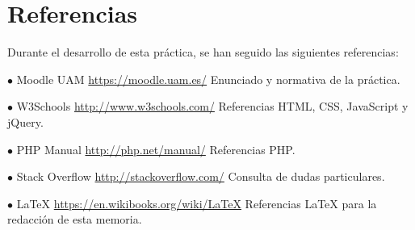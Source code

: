 \documentclass{article}
\begin{document}
\section{Referencias}
Durante el desarrollo de esta práctica, se han seguido las siguientes referencias:
\begin{ldescription}
    \item[$\bullet$ Moodle UAM \url{https://moodle.uam.es/}]
        Enunciado y normativa de la práctica.
    \item[$\bullet$ W3Schools \url{http://www.w3schools.com/}]
        Referencias HTML, CSS, JavaScript y jQuery.
    \item[$\bullet$ PHP Manual \url{http://php.net/manual/}]
        Referencias PHP.
    \item[$\bullet$ Stack Overflow \url{http://stackoverflow.com/}]
        Consulta de dudas particulares.
    \item[$\bullet$ LaTeX \url{https://en.wikibooks.org/wiki/LaTeX}]
        Referencias LaTeX para la redacción de esta memoria.
\end{ldescription}
\end{document}
